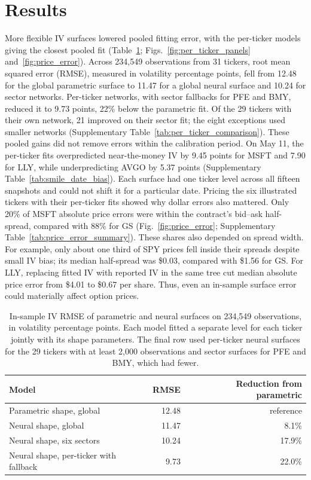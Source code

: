 \section{Results}\label{sec:results}

More flexible IV surfaces lowered pooled fitting error, with the per-ticker models giving the closest pooled fit (Table~\ref{tab:three_way}; Figs.~\ref{fig:per_ticker_panels} and~\ref{fig:price_error}). Across 234{,}549 observations from 31 tickers, root mean squared error (RMSE), measured in volatility percentage points, fell from 12.48 for the global parametric surface to 11.47 for a global neural surface and 10.24 for sector networks. Per-ticker networks, with sector fallbacks for PFE and BMY, reduced it to 9.73 points, 22\% below the parametric fit. Of the 29 tickers with their own network, 21 improved on their sector fit; the eight exceptions used smaller networks (Supplementary Table~\ref{tab:per_ticker_comparison}). These pooled gains did not remove errors within the calibration period. On May 11, the per-ticker fits overpredicted near-the-money IV by 9.45 points for MSFT and 7.90 for LLY, while underpredicting AVGO by 5.37 points (Supplementary Table~\ref{tab:smile_date_bias}). Each surface had one ticker level across all fifteen snapshots and could not shift it for a particular date. Pricing the six illustrated tickers with their per-ticker fits showed why dollar errors also mattered. Only 20\% of MSFT absolute price errors were within the contract's bid--ask half-spread, compared with 88\% for GS (Fig.~\ref{fig:price_error}; Supplementary Table~\ref{tab:price_error_summary}). These shares also depended on spread width. For example, only about one third of SPY prices fell inside their spreads despite small IV bias; its median half-spread was \$0.03, compared with \$1.56 for GS. For LLY, replacing fitted IV with reported IV in the same tree cut median absolute price error from \$4.01 to \$0.67 per share. Thus, even an in-sample surface error could materially affect option prices.

\begin{table}[H]
\centering
\caption{In-sample IV RMSE of parametric and neural surfaces on 234{,}549 observations, in volatility percentage points. Each model fitted a separate level for each ticker jointly with its shape parameters. The final row used per-ticker neural surfaces for the 29 tickers with at least 2{,}000 observations and sector surfaces for PFE and BMY, which had fewer.}\label{tab:three_way}
\begin{tabular}{lrr}
\toprule
Model & RMSE & Reduction from parametric \\
\midrule
Parametric shape, global               & 12.48 & reference \\
Neural shape, global                   & 11.47 & 8.1\% \\
Neural shape, six sectors              & 10.24 & 17.9\% \\
Neural shape, per-ticker with fallback &  9.73 & 22.0\% \\
\bottomrule
\end{tabular}
\end{table}

